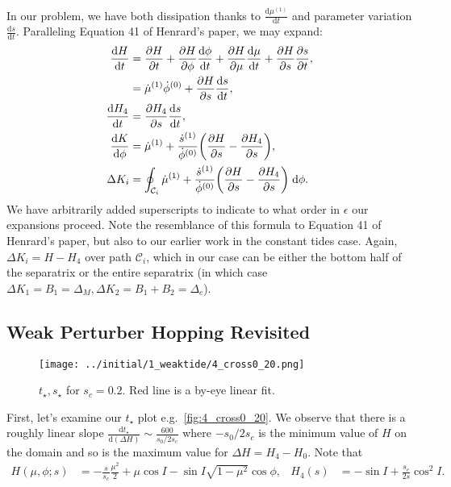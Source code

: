 \documentclass[11pt,
        usenames, %
        dvipsnames %
    ]{article}
\newcommand*{\rd}[2]{\frac{\mathrm{d}#1}{\mathrm{d}#2}}
\newcommand*{\pd}[2]{\frac{\partial#1}{\partial#2}}
\DeclarePairedDelimiter\p{\lparen}{\rparen}
\begin{document}
In our problem, we have both dissipation thanks to $\rd{\mu^{(1)}}{t}$ and
parameter variation $\rd{s}{t}$. Paralleling Equation 41 of Henrard's paper, we
may expand:
\begin{align}
    \rd{H}{t} &= \pd{H}{t} + \pd{H}{\phi}\rd{\phi}{t} + \pd{H}{\mu}\rd{\mu}{t}
            + \pd{H}{s}\pd{s}{t},\nonumber\\
        &= \dot{\mu}^{(1)} \dot{\phi}^{(0)} + \pd{H}{s}\rd{s}{t},\\
    \rd{H_4}{t} &= \pd{H_4}{s}\rd{s}{t},\\
    \rd{K}{\phi} &=
        \dot{\mu}^{(1)} + \frac{\dot{s}^{(1)}}{\dot{\phi}^{(0)}}
            \p*{\pd{H}{s} - \pd{H_4}{s}},\\
    \Delta K_i &= \oint_{\mathcal{C}_i}
        \dot{\mu}^{(1)} + \frac{\dot{s}^{(1)}}{\dot{\phi}^{(0)}}
            \p*{\pd{H}{s} - \pd{H_4}{s}}\;\mathrm{d}\phi.
\end{align}
We have arbitrarily added superscripts to indicate to what order in $\epsilon$
our expansions proceed. Note the resemblance of this formula to Equation 41 of
Henrard's paper, but also to our earlier work in the constant tides case. Again,
$\Delta K_i = H - H_4$ over path $\mathcal{C}_i$, which in our case can be either
the bottom half of the separatrix or the entire separatrix (in which case
$\Delta K_1 = B_1 = \Delta_M, \Delta K_2 = B_1 + B_2 = \Delta_c$).

\subsection{Weak Perturber Hopping Revisited}\label{ss:revisited}

\begin{figure}[t]
    \centering
    \texttt{[image: ../initial/1\_weaktide/4\_cross0\_20.png]}
    \caption{$t_\star, s_\star$ for $s_c = 0.2$. Red line is a by-eye linear
    fit.}\label{fig:4_cross0_20}
\end{figure}

First, let's examine our $t_{\star}$ plot e.g.\ \autoref{fig:4_cross0_20}. We
observe that there is a roughly linear slope $\rd{t_{\star}}{(\Delta H)} \sim
\frac{600}{s_0/2s_c}$ where $-s_0/2s_c$ is the minimum value of $H$ on the
domain and so is the maximum value for $\Delta H = H_4 - H_0$. Note that
\begin{align*}
    H(\mu, \phi; s) &= -\frac{s}{s_c}\frac{\mu^2}{2}
        + \mu \cos I - \sin I \sqrt{1 - \mu^2}\cos \phi,&
    H_4(s) &= -\sin I + \frac{s_c}{2s}\cos^2 I.
\end{align*}
\end{document}
